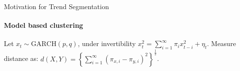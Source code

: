 \documentclass{beamer}
\begin{document}
\begin{frame}{Motivation for Trend Segmentation}
\framesubtitle{Model based clustering}


Let $x_t \sim \text{GARCH}(p,q)$, under invertibility
$x_t^2 = \sum_{i=1}^\infty \pi_{i} x_{t-i}^2 + \eta_{t}$. Measure distance as: $ d\left ( X, Y \right ) = \left \{ \sum_{i=1}^\infty \left ( \pi_{x,i} - \pi_{y,i} \right )^2 \right \}^{\frac{1}{2}}$. 

\bigskip

\begin{figure}
    \centering
    \begin{subfigure}
        \texttt{[image: ../plots/SnP500\_garch\_dissimilar\_1.png]}
    \end{subfigure}
    \begin{subfigure}
        \texttt{[image: ../plots/SnP500\_garch\_dissimilar\_2.png]}
    \end{subfigure}\
\end{figure}

\end{frame}



\end{document}
